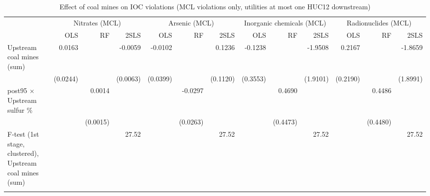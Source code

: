 
\begin{table}[htbp]
   
   \caption{\label{2sls_dwnstrm_minevio_mcl_ivsum} Effect of coal mines on IOC violations (MCL violations only, utilities at most one HUC12 downstream)}
   \bigskip
   
   \centering
   
   \begin{adjustbox}{width = \textwidth, center}
      
      
      \begin{tabular}{lrrrrrrrrrrrr}
         \toprule
         
          & \multicolumn{3}{c}{Nitrates (MCL)} & \multicolumn{3}{c}{Arsenic (MCL)} & \multicolumn{3}{c}{Inorganic chemicals (MCL)} & \multicolumn{3}{c}{Radionuclides (MCL)}\\
         
                                                                  & OLS      & RF       & 2SLS     & OLS      & RF       & 2SLS     & OLS      & RF       & 2SLS     & OLS      & RF       & 2SLS\\  
         
         \midrule 
         Upstream coal mines (sum)                                & 0.0163   &          & -0.0059  & -0.0102  &          & 0.1236   & -0.1238  &          & -1.9508  & 0.2167   &          & -1.8659\\   
                                                                  & (0.0244) &          & (0.0063) & (0.0399) &          & (0.1120) & (0.3553) &          & (1.9101) & (0.2190) &          & (1.8991)\\   
         post95 $\times$ Upstream sulfur \%                       &          & 0.0014   &          &          & -0.0297  &          &          & 0.4690   &          &          & 0.4486   &   \\   
                                                                  &          & (0.0015) &          &          & (0.0263) &          &          & (0.4473) &          &          & (0.4480) &   \\   
         
         F-test (1st stage, clustered), Upstream coal mines (sum) &          &          & 27.52    &          &          & 27.52    &          &          & 27.52    &          &          & 27.52\\  
         
          \\
         

\end{tabular}
\end{adjustbox}
\end{table}
